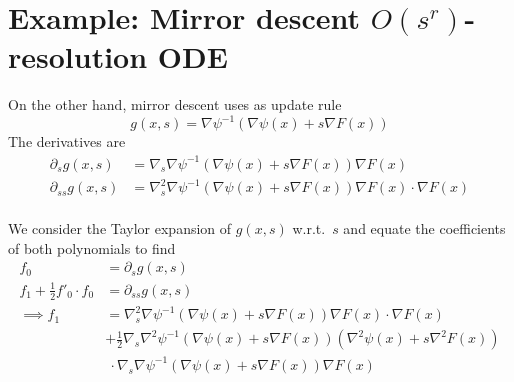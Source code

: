 \documentclass[main.tex]{subfiles}
\begin{document}
\section{Example: Mirror descent $O(s^r)$-resolution ODE}

On the other hand, mirror descent uses as update rule
\[ g(x, s) = \nabla\psi^{-1}(\nabla\psi(x) + s \nabla F(x)) \]
The derivatives are
\begin{align*}
	\partial_s g(x, s)    & = \nabla_s \nabla \psi^{-1}(\nabla\psi(x) + s \nabla F(x))\nabla F(x)                      \\
	\partial_{ss} g(x, s) & = \nabla^2_s \nabla \psi^{-1}(\nabla\psi(x) + s \nabla F(x)) \nabla F(x) \cdot \nabla F(x) \\
\end{align*}

We consider the Taylor expansion of $g(x,s)$ w.r.t.\ $s$ and equate the coefficients of both polynomials to find
\begin{align*}
	f_0                             & = \partial_s g(x,s)                                                                                         \\
	f_1 + \frac{1}{2}f'_0 \cdot f_0 & = \partial_{ss} g(x,s)                                                                                      \\
	\implies f_1                    & = \nabla^2_s \nabla \psi^{-1}(\nabla\psi(x) + s \nabla F(x)) \nabla F(x) \cdot \nabla F(x)                  \\
	                                & + \frac{1}{2}\nabla_s \nabla^2 \psi^{-1}(\nabla \psi (x) + s \nabla F(x))(\nabla^2 \psi(x) + s\nabla^2F(x)) \\
	                                & \ \cdot  \nabla_s \nabla \psi^{-1}(\nabla\psi(x) + s \nabla F(x))\nabla F(x)
\end{align*}
\end{document}
